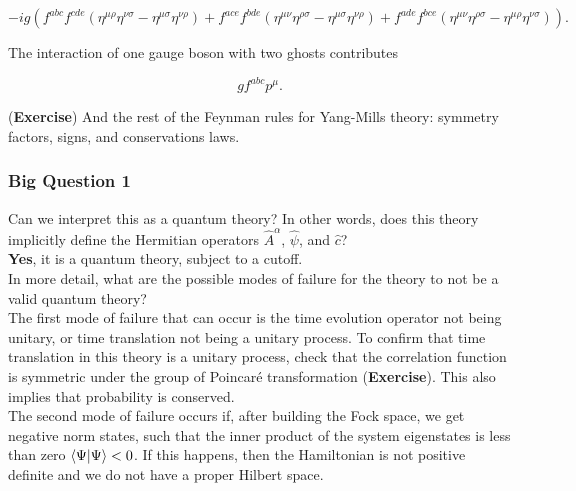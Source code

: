 \documentclass[10pt]{article}
\begin{document}
\begin{equation}
-ig ( f^{abc} f^{cde} (\eta^{\mu\rho} \eta^{\nu\sigma} - \eta^{\mu\sigma} \eta^{\nu\rho}) + f^{ace} f^{bde} (\eta^{\mu\nu} \eta^{\rho\sigma} - \eta^{\mu\sigma} \eta^{\nu\rho}) + f^{ade} f^{bce} (\eta^{\mu\nu} \eta^{\rho\sigma} - \eta^{\mu\rho} \eta^{\nu\sigma}) ).
\end{equation}

\noindent The interaction of one gauge boson with two ghosts contributes

\begin{equation}
g f^{abc} p^\mu.
\end{equation}

\noindent (\textbf{Exercise}) And the rest of the Feynman rules for Yang-Mills theory: symmetry factors, signs, and conservations laws.  \\

\subsubsection*{Big Question 1}

\noindent Can we interpret this as a quantum theory? In other words, does this theory implicitly define the Hermitian operators $\hat{A}^\alpha$, $\hat{\psi}$, and $\hat{c}$? \\

\noindent \textbf{Yes}, it is a quantum theory, subject to a cutoff. \\

\noindent In more detail, what are the possible modes of failure for the theory to not be a valid quantum theory? \\

\noindent The first mode of failure that can occur is the time evolution operator not being unitary, or time translation not being a unitary process. To confirm that time translation in this theory is a unitary process, check that the correlation function is symmetric under the group of Poincar\'e transformation (\textbf{Exercise}). This also implies that probability is conserved. \\

\noindent The second mode of failure occurs if, after building the Fock space, we get negative norm states, such that the inner product of the system eigenstates is less than zero $\braket{\Psi | \Psi} < 0$. If this happens, then the Hamiltonian is not positive definite and we do not have a proper Hilbert space. \\
\end{document}
